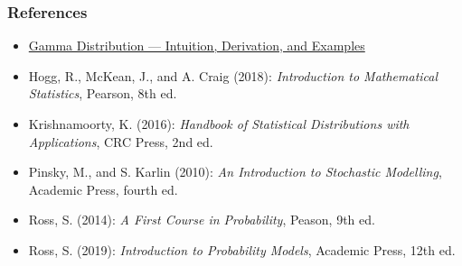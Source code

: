 \documentclass[10pt]{beamer}
\theoremstyle{definition}
\begin{document}
\begin{frame}[fragile]
	\frametitle{References}
	\begin{itemize}
		\item \href{https://towardsdatascience.com/gamma-distribution-intuition-derivation-and-examples-55f407423840}{Gamma Distribution — Intuition, Derivation, and Examples}
		
		\item Hogg, R., McKean, J., and A. Craig (2018): \textit{Introduction to Mathematical Statistics}, Pearson, 8th ed.
		
		\item Krishnamoorty, K. (2016): \textit{Handbook of	Statistical Distributions with Applications}, CRC Press, 2nd ed.
		
		\item Pinsky, M., and S. Karlin (2010): \textit{An Introduction to Stochastic Modelling}, Academic Press, fourth ed.
		
		\item Ross, S. (2014): \textit{A First Course in Probability}, Peason, 9th ed.
		
		\item Ross, S. (2019): \textit{Introduction to Probability Models}, Academic Press, 12th ed.		
	\end{itemize}
\end{frame}
\end{document}
